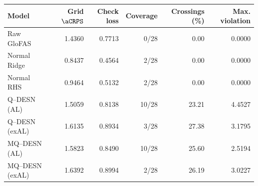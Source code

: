 \begin{tabular}{lrrrrr}
\toprule
Model & Grid $\aCRPS$ & Check loss & Coverage & Crossings (\%) & Max. violation \\
\midrule
Raw GloFAS & 1.4360 & 0.7713 & 0/28 & 0.00 & 0.0000 \\
Normal Ridge & 0.8437 & 0.4564 & 2/28 & 0.00 & 0.0000 \\
Normal RHS & 0.9464 & 0.5132 & 2/28 & 0.00 & 0.0000 \\
Q--DESN (AL) & 1.5059 & 0.8138 & 10/28 & 23.21 & 4.4527 \\
Q--DESN (exAL) & 1.6135 & 0.8934 & 3/28 & 27.38 & 3.1795 \\
MQ--DESN (AL) & 1.5823 & 0.8490 & 10/28 & 25.60 & 2.5194 \\
MQ--DESN (exAL) & 1.6392 & 0.8994 & 2/28 & 26.19 & 3.0227 \\
\bottomrule
\end{tabular}
